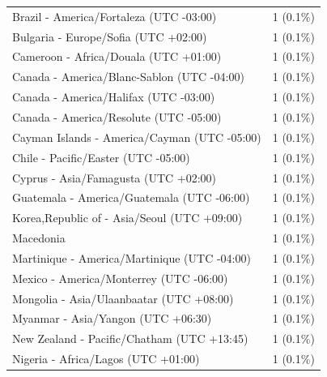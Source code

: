 \documentclass[
  english,
  man]{apa6}
\begin{document}
\begin{appendix}
\begin{table}
{\begin{tabular}[t]{ll}
\hspace{1em}Brazil - America/Fortaleza (UTC -03:00) & 1 (0.1\%)\\
\hspace{1em}Bulgaria - Europe/Sofia (UTC +02:00) & 1 (0.1\%)\\
\hspace{1em}Cameroon - Africa/Douala (UTC +01:00) & 1 (0.1\%)\\
\hspace{1em}Canada - America/Blanc-Sablon (UTC -04:00) & 1 (0.1\%)\\
\addlinespace
\hspace{1em}Canada - America/Halifax (UTC -03:00) & 1 (0.1\%)\\
\hspace{1em}Canada - America/Resolute (UTC -05:00) & 1 (0.1\%)\\
\hspace{1em}Cayman Islands - America/Cayman (UTC -05:00) & 1 (0.1\%)\\
\hspace{1em}Chile - Pacific/Easter (UTC -05:00) & 1 (0.1\%)\\
\hspace{1em}Cyprus - Asia/Famagusta (UTC +02:00) & 1 (0.1\%)\\
\addlinespace
\hspace{1em}Guatemala - America/Guatemala (UTC -06:00) & 1 (0.1\%)\\
\hspace{1em}Korea,Republic of - Asia/Seoul (UTC +09:00) & 1 (0.1\%)\\
\hspace{1em}Macedonia & 1 (0.1\%)\\
\hspace{1em}Martinique - America/Martinique (UTC -04:00) & 1 (0.1\%)\\
\hspace{1em}Mexico - America/Monterrey (UTC -06:00) & 1 (0.1\%)\\
\addlinespace
\hspace{1em}Mongolia - Asia/Ulaanbaatar (UTC +08:00) & 1 (0.1\%)\\
\hspace{1em}Myanmar - Asia/Yangon (UTC +06:30) & 1 (0.1\%)\\
\hspace{1em}New Zealand - Pacific/Chatham (UTC +13:45) & 1 (0.1\%)\\
\hspace{1em}Nigeria - Africa/Lagos (UTC +01:00) & 1 (0.1\%)\\

\end{tabular}}
\end{table}
\end{appendix}
\end{document}
